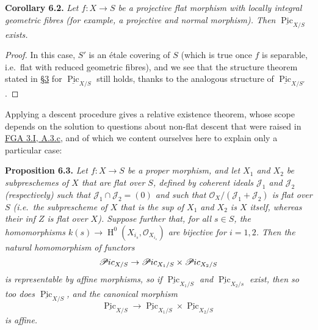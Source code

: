 \documentclass{article}
\newenvironment{itenv}[1]
  {\phantomsection\par\smallskip\noindent\textbf{#1.}\itshape}
  {\par\smallskip}
\theoremstyle{definition}
\theoremstyle{definition}
\theoremstyle{definition}
\theoremstyle{definition}
\theoremstyle{remark}
\begin{document}
\leavevmode{}%
\begin{itenv}{Corollary 6.2}
Let \(f\colon X\to S\) be a projective flat morphism with locally integral geometric fibres (for example, a projective and normal morphism).
Then \(\underline{\operatorname{Pic}}_{X/S}\) exists.

\end{itenv}

\begin{proof}
In this case, \(S'\) is an étale covering of \(S\) (which is true once \(f\) is separable, i.e.~flat with reduced geometric fibres), and we see that the structure theorem stated in \protect\hyperlink{fga-3-v-section-3}{§3} for \(\underline{\operatorname{Pic}}_{X/S}\) still holds, thanks to the analogous structure of \(\underline{\operatorname{Pic}}_{X/S'}\).
\end{proof}

Applying a descent procedure gives a relative existence theorem, whose scope depends on the solution to questions about non-flat descent that were raised in \protect\hyperlink{fga-3-i-section-A.3.c}{FGA 3.I, A.3.c}, and of which we content ourselves here to explain only a particular case:

\leavevmode{}%
\begin{itenv}{Proposition 6.3}
Let \(f\colon X\to S\) be a proper morphism, and let \(X_1\) and \(X_2\) be subpreschemes of \(X\) that are flat over \(S\), defined by coherent ideals \({\mathscr{J}}_1\) and \({\mathscr{J}}_2\) (respectively) such that \({\mathscr{J}}_1\cap{\mathscr{J}}_2=(0)\) and such that \({\mathscr{O}}_X/({\mathscr{J}}_1+{\mathscr{J}}_2)\) is flat over \(S\) (i.e.~the subprescheme of \(X\) that is the sup of \(X_1\) and \(X_2\) is \(X\) itself, whereas their inf \(Z\) is flat over \(X\)).
Suppose further that, for all \(s\in S\), the homomorphisms \(k(s)\to\operatorname{H}^0(X_{i_s},{\mathscr{O}}_{X_{i_s}})\) are bijective for \(i=1,2\).
Then the natural homomorphism of functors
\[
  \mathscr{P}\kern -.5pt ic_{X/S}
  \to \mathscr{P}\kern -.5pt ic_{X_1/S} \times \mathscr{P}\kern -.5pt ic_{X_2/S}
\]
is representable by affine morphisms, so if \(\underline{\operatorname{Pic}}_{X_1/S}\) and \(\underline{\operatorname{Pic}}_{X_2/s}\) exist, then so too does \(\underline{\operatorname{Pic}}_{X/S}\), and the canonical morphism
\[
  \underline{\operatorname{Pic}}_{X/S}
  \to \underline{\operatorname{Pic}}_{X_1/S} \times \underline{\operatorname{Pic}}_{X_2/S}
\]
is affine.

\end{itenv}
\end{document}
